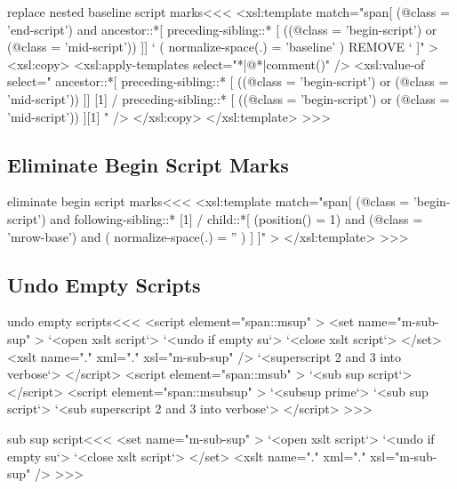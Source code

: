\documentclass{article}
\begin{document}
\<replace nested baseline script marks\><<<
<xsl:template match="span[
     (@class = 'end-script')
   and
     ancestor::*[ preceding-sibling::* [
       ((@class = 'begin-script') or (@class = 'mid-script')) ]]
`%
     ( normalize-space(.) = 'baseline' )     REMOVE `%
]" >
  <xsl:copy>
     <xsl:apply-templates select="*|@*|comment()" />
     <xsl:value-of select="
            ancestor::*[ preceding-sibling::* [
                           ((@class = 'begin-script') or 
                            (@class = 'mid-script'))     ]]  [1]
            / preceding-sibling::* [
                           ((@class = 'begin-script') or 
                            (@class = 'mid-script'))  ][1]
      " />
  </xsl:copy>
</xsl:template>   
>>>


\subsection{Eliminate  Begin Script Marks}



\<eliminate begin script marks\><<<
<xsl:template match="span[
     (@class = 'begin-script')
   and
     following-sibling::* [1] / child::*[  
       (position() = 1)
       and 
       (@class = 'mrow-base')
       and
       ( normalize-space(.) = '' )
     ]
]"  >
</xsl:template> 
>>>



\subsection{Undo Empty Scripts}




\<undo empty scripts\><<<
<script element="span::msup" >
   <set name="m-sub-sup" >
     `<open xslt script`>
     `<undo if empty su`> 
     `<close xslt script`>
   </set>
   <xslt name="." xml="." xsl="m-sub-sup" />
   `<superscript 2 and 3 into verbose`>
</script> 
<script element="span::msub" >
  `<sub sup script`>
</script> 
<script element="span::msubsup" >
  `<subsup prime`>
  `<sub sup script`>
  `<sub superscript 2 and 3 into verbose`>
</script> 
>>>

\<sub sup script\><<<
<set name="m-sub-sup" >
  `<open xslt script`>
  `<undo if empty su`> 
  `<close xslt script`>
</set>
<xslt name="." xml="." xsl="m-sub-sup" />
>>>
\end{document}
